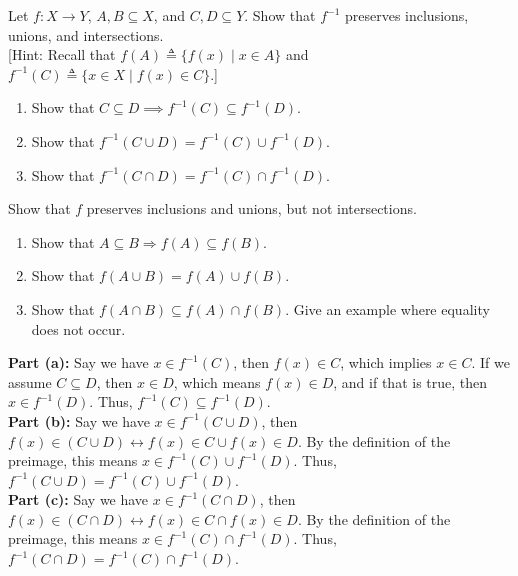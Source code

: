 \documentclass[11pt]{article}
\providecommand{\ra}{\rightarrow}
\begin{document}
\begin{homeworkProblem}
    Let $f : X \ra Y$, $A, B \subseteq X$, and $C, D \subseteq Y$. Show that $f^{-1}$ preserves inclusions, unions,
    and intersections. \\[0.2\baselineskip]
    {[Hint: Recall that $f(A) \triangleq \{f(x) \mid x \in A\}$ and $f^{-1}(C) \triangleq \{x \in X \mid f(x) \in C\}$.]}
    \begin{enumerate}[label=(\alph*), itemsep=5pt, topsep=10pt]
        \item Show that $C \subseteq D \implies f^{-1}(C) \subseteq f^{-1}(D)$.
        \item Show that $f^{-1}(C \cup D) = f^{-1}(C) \cup f^{-1}(D)$.
        \item Show that $f^{-1}(C \cap D) = f^{-1}(C) \cap f^{-1}(D)$.
    \end{enumerate} \vspace{0.2\baselineskip}
    Show that $f$ preserves inclusions and unions, but not intersections.
    \begin{enumerate}[label=(\alph*), start=4, itemsep=5pt, topsep=10pt]
        \item Show that $A \subseteq B \Longrightarrow f(A) \subseteq f(B)$.
        \item Show that $f(A \cup B)=f(A) \cup f(B)$.
        \item Show that $f(A \cap B) \subseteq f(A) \cap f(B)$. Give an example where equality does not occur.
    \end{enumerate} \vspace{1\baselineskip}

    \solution

    \textbf{Part (a):} Say we have $x \in f^{-1}(C)$, then $f(x) \in C$, which implies $x \in C$. If we assume $C \subseteq D$, then $x \in D$, which
    means $f(x) \in D$, and if that is true, then $x \in f^{-1}(D)$. Thus, $f^{-1}(C) \subseteq f^{-1}(D)$. \\

    \textbf{Part (b):} Say we have $x \in f^{-1}(C \cup D)$, then $f(x) \in (C \cup D) \leftrightarrow f(x) \in C \cup f(x) \in D$. By the
    definition of the preimage, this means $x \in f^{-1}(C) \cup f^{-1}(D)$. Thus, $f^{-1}(C \cup D) = f^{-1}(C) \cup f^{-1}(D)$. \\

    \textbf{Part (c):} Say we have $x \in f^{-1}(C \cap D)$, then $f(x) \in (C \cap D) \leftrightarrow f(x) \in C \cap f(x) \in D$. By the
    definition of the preimage, this means $x \in f^{-1}(C) \cap f^{-1}(D)$. Thus, $f^{-1}(C \cap D) = f^{-1}(C) \cap f^{-1}(D)$. \\


\end{homeworkProblem}
\end{document}
